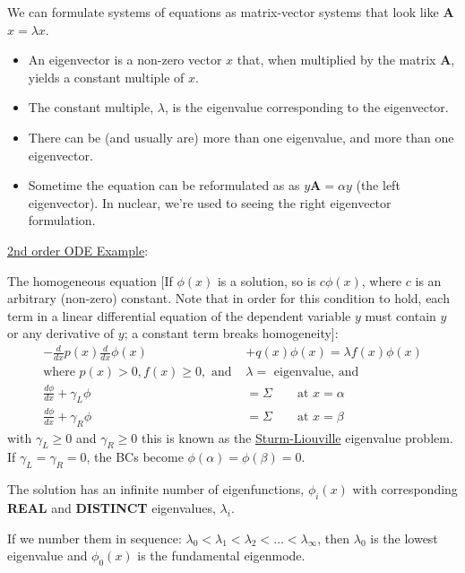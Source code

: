 \documentclass[12pt]{article}
\newcommand{\ve}[1]{\ensuremath{\mathbf{#1}}}
\newcommand{\Macro}{\ensuremath{\Sigma}}
\begin{document}
We can formulate systems of equations as matrix-vector systems that look like \ve{A}$x = \lambda x$. 
\begin{itemize}
\item An eigenvector is a non-zero vector $x$ that, when multiplied by the matrix \ve{A}, yields a constant multiple of $x$. 
\item The constant multiple, $\lambda$, is the eigenvalue corresponding to the eigenvector.
\item There can be (and usually are) more than one eigenvalue, and more than one eigenvector. 
\item Sometime the equation can be reformulated as as $y\ve{A} = \alpha y$ (the left eigenvector). In nuclear, we're used to seeing the right eigenvector formulation.
\end{itemize}

\vspace*{1em}
\noindent \underline{2nd order ODE Example}:

The homogeneous equation [If  $\phi(x)$  is a solution, so is  $c \phi(x)$, where $c$ is an arbitrary (non-zero) constant. Note that in order for this condition to hold, each term in a linear differential equation of the dependent variable $y$ must contain $y$ or any derivative of $y$; a constant term breaks homogeneity]:
%
\begin{align}
-\frac{d}{dx}p(x) \frac{d}{dx}\phi(x) &+ q(x)\phi(x) = \lambda f(x) \phi(x) \nonumber \\
\text{where }p(x) > 0, f(x) \geq 0, \text{ and }& \lambda = \text{ eigenvalue, and}\nonumber \\
\frac{d\phi}{dx} + \gamma_L \phi &= \Macro \qquad \text{at }x=\alpha \nonumber \\
\frac{d\phi}{dx} + \gamma_R \phi &= \Macro \qquad \text{at }x=\beta \nonumber
\end{align}
%
with $\gamma_L \geq 0$ and $\gamma_R \geq 0$ this is known as the \underline{Sturm-Liouville} eigenvalue problem. If $\gamma_L = \gamma_R = 0$, the BCs become $\phi(\alpha) = \phi(\beta) = 0$.

The solution has an infinite number of eigenfunctions, $\phi_i(x)$ with corresponding \textbf{REAL} and \textbf{DISTINCT} eigenvalues, $\lambda_i$. 

If we number them in sequence: $\lambda_0 < \lambda_1 < \lambda_2 < \dots < \lambda_{\infty}$, then $\lambda_0$ is the lowest eigenvalue and $\phi_0(x)$ is the fundamental eigenmode. 
\end{document}
